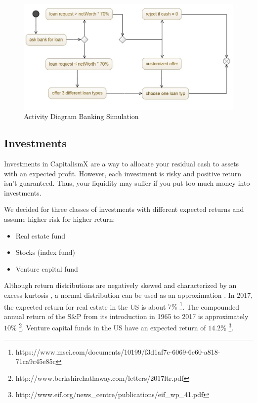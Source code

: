 \begin{figure} [h]
	\centering
	\includegraphics[width=12cm]{images/activity_diagram.JPG}
	\caption{Activity Diagram Banking Simulation}
	\label{jpg:banking}
\end{figure}


\subsection{Investments}
\label{sec:investments_simulation}

 Investments in CapitalismX are a way to allocate your residual cash to assets with an expected profit. However, each investment is risky and positive return isn't guaranteed. Thus, your liquidity may suffer if you put too much money into investments.
  
  We decided for three classes of investments with different expected returns and assume higher risk for higher return:
\begin{itemize}
	\item Real estate fund
	\item Stocks (index fund)
	\item Venture capital fund
\end{itemize}

Although return distributions are negatively skewed and characterized by an excess kurtosis \cite{ANDERSEN200143}, a normal distribution can be used as an approximation \cite{doi:10.1080/01621459.1972.10481297}. In 2017, the expected return for real estate in the US is about $7\%$ \footnote{https://www.msci.com/documents/10199/f3d1af7c-6069-6e60-a818-71ca9c45e85c}. The compounded annual return of the S\&P from its introduction in 1965 to 2017 is approximately $10\%$ \footnote{http://www.berkshirehathaway.com/letters/2017ltr.pdf}. Venture capital funds in the US have an expected return of $14.2\%$ \footnote{http://www.eif.org/news\_centre/publications/eif\_wp\_41.pdf}.

